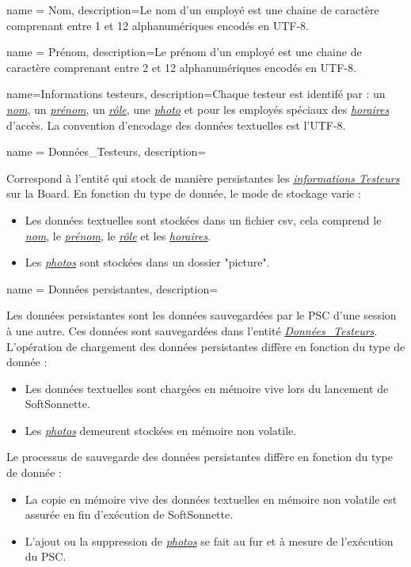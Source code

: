 {
    name = {Nom},
    description={\hypertarget{nom}{}Le nom d'un employé est une chaine de caractère comprenant entre 1 et 12 alphanumériques encodés en UTF-8.
    }
}

{
    name = {Prénom},
    description={\hypertarget{prenom}{}Le prénom d'un employé est une chaine de caractère comprenant entre 2 et 12 alphanumériques encodés en UTF-8.
    }
}

{
    name={Informations testeurs},
    description={\hypertarget{caracEmploye}{}Chaque testeur est identifé par : un \hyperlink{nom}{\textit{nom}}, un \hyperlink{prenom}{\textit{prénom}}, un \hyperlink{rol}{\textit{rôle}}, une \hyperlink{photo}{\textit{photo}} et pour les employés spéciaux des \hyperlink{hor}{\textit{horaires}} d'accès. 
    La convention d'encodage des données textuelles est l'UTF-8.
    }
}

{
    name = {Données\_Testeurs},
    description={\hypertarget{donneesTesteurs}{}Correspond à l'entité qui stock de manière persistantes les \hyperlink{caracEmploye}{\textit{informations Testeurs}} sur la Board.
    En fonction du type de donnée, le mode de stockage varie : 
    \begin{itemize}
        \item Les données textuelles sont stockées dans un fichier csv, cela comprend le \hyperlink{nom}{\textit{nom}}, le \hyperlink{prenom}{\textit{prénom}}, le \hyperlink{rol}{\textit{rôle}} et les \hyperlink{hor}{\textit{horaires}}.
        \item Les \hyperlink{photo}{\textit{photos}} sont stockées dans un dossier "picture".
    \end{itemize}
    }
}

{
    name = {Données persistantes},
    description={\hypertarget{donneesPersistantes}{}Les données persistantes sont les données sauvegardées par le PSC d'une session à une autre. 
    Ces données sont sauvegardées dans l'entité \hyperlink{donneesTesteurs}{\textit{Données\_Testeurs}}.
    L'opération de chargement des données persistantes diffère en fonction du type de donnée :
    \begin{itemize}
        \item Les données textuelles sont chargées en mémoire vive lors du lancement de SoftSonnette.
        \item Les \hyperlink{photo}{\textit{photos}} demeurent stockées en mémoire non volatile.
    \end{itemize}
    Le processus de sauvegarde des données persistantes diffère en fonction du type de donnée :
    \begin{itemize}
        \item La copie en mémoire vive des données textuelles en mémoire non volatile est assurée en fin d'exécution de SoftSonnette.
        \item L'ajout ou la suppression de \hyperlink{photo}{\textit{photos}} se fait au fur et à mesure de l'exécution du PSC.
    \end{itemize}
    }
}

